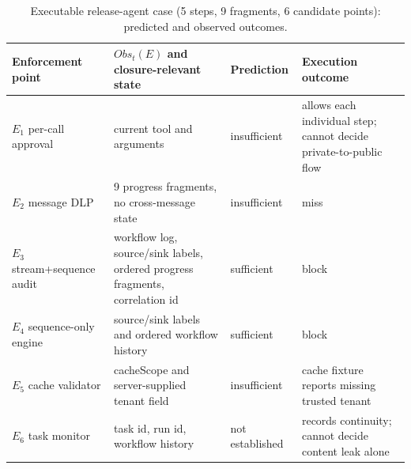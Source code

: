 \begin{table}[t]
  \caption{Executable release-agent case (5 steps, 9 fragments, 6 candidate points): predicted and observed outcomes.}
  \label{tab:end-to-end-case}
  \centering\footnotesize
  \begin{tabular}{@{}p{}p{}p{}p{}@{}}
    \toprule
    Enforcement point & $Obs_t(E)$ and closure-relevant state & Prediction & Execution outcome \\
    \midrule
    $E_1$ per-call approval & current tool and arguments & insufficient & allows each individual step; cannot decide private-to-public flow \\
    $E_2$ message DLP & 9 progress fragments, no cross-message state & insufficient & miss \\
    $E_3$ stream+sequence audit & workflow log, source/sink labels, ordered progress fragments, correlation id & sufficient & block \\
    $E_4$ sequence-only engine & source/sink labels and ordered workflow history & sufficient & block \\
    $E_5$ cache validator & cacheScope and server-supplied tenant field & insufficient & cache fixture reports missing trusted tenant \\
    $E_6$ task monitor & task id, run id, workflow history & not established & records continuity; cannot decide content leak alone \\
    \bottomrule
  \end{tabular}
\end{table}
